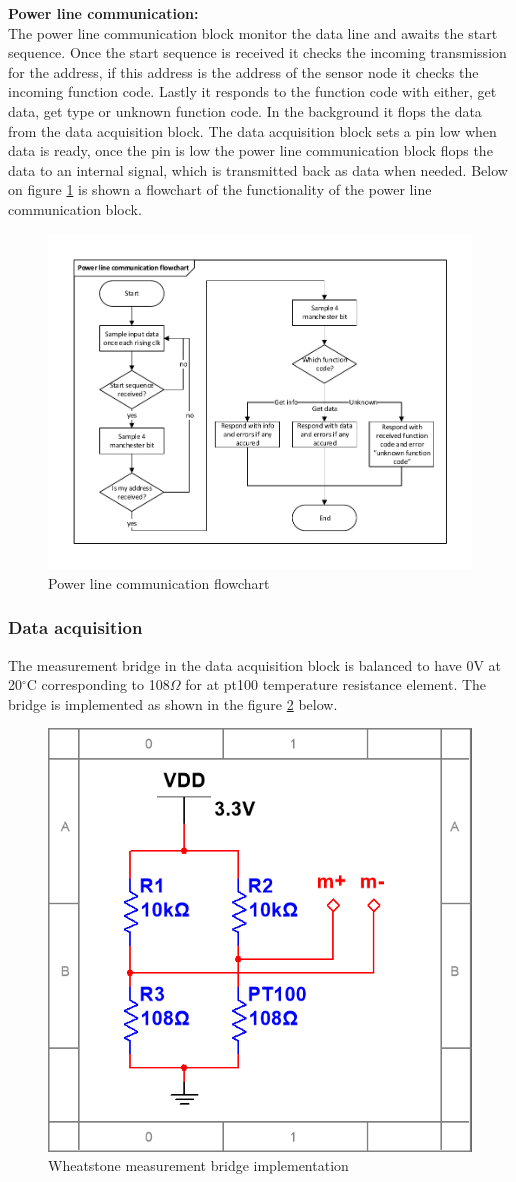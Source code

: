 \textbf{Power line communication:}\\
The power line communication block monitor the data line and awaits the start sequence. Once the start sequence is received it checks the incoming transmission for the address, if this address is the address of the sensor node it checks the incoming function code. Lastly it responds to the function code with either, get data, get type or unknown function code. In the background it flops the data from the data acquisition block. The data acquisition block sets a pin low when data is ready, once the pin is low the power line communication block flops the data to an internal signal, which is transmitted back as data when needed. Below on figure \ref{fig:powerline_flow} is shown a flowchart of the functionality of the power line communication block.

\begin{figure}[H]
	\centering
	\includegraphics[width=.6\textwidth]{billeder/powerline_communication_flowchart}
	\caption{Power line communication flowchart}
	\label{fig:powerline_flow}
\end{figure}


\subsubsection{Data acquisition}
The measurement bridge in the data acquisition block is balanced to have 0V at 20$^\circ$C corresponding to 108$\Omega$ for at pt100 temperature resistance element. The bridge is implemented as shown in the figure \ref{fig:m_bridge} below.

\begin{figure}[H]
	\centering
	\includegraphics[width=.4\textwidth]{billeder/m_bridge}
	\caption{Wheatstone measurement bridge implementation}
	\label{fig:m_bridge}
\end{figure}

